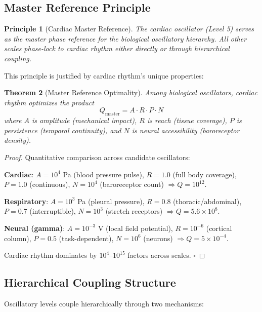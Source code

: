 \documentclass[12pt]{article}
\newtheorem{theorem}{Theorem}[section]
\newtheorem{principle}[theorem]{Principle}
\theoremstyle{remark}
\begin{document}
\subsection{Master Reference Principle}

\begin{principle}[Cardiac Master Reference]
The cardiac oscillator (Level 5) serves as the master phase reference for the biological oscillatory hierarchy. All other scales phase-lock to cardiac rhythm either directly or through hierarchical coupling.
\end{principle}

This principle is justified by cardiac rhythm's unique properties:

\begin{theorem}[Master Reference Optimality]
Among biological oscillators, cardiac rhythm optimizes the product
\begin{equation}
Q_{\text{master}} = A \cdot R \cdot P \cdot N
\end{equation}
where $A$ is amplitude (mechanical impact), $R$ is reach (tissue coverage), $P$ is persistence (temporal continuity), and $N$ is neural accessibility (baroreceptor density).
\end{theorem}

\begin{proof}
Quantitative comparison across candidate oscillators:

\textbf{Cardiac}: $A = 10^4$ Pa (blood pressure pulse), $R = 1.0$ (full body coverage), $P = 1.0$ (continuous), $N = 10^4$ (baroreceptor count) $\Rightarrow Q = 10^{12}$.

\textbf{Respiratory}: $A = 10^3$ Pa (pleural pressure), $R = 0.8$ (thoracic/abdominal), $P = 0.7$ (interruptible), $N = 10^3$ (stretch receptors) $\Rightarrow Q = 5.6 \times 10^8$.

\textbf{Neural (gamma)}: $A = 10^{-3}$ V (local field potential), $R = 10^{-6}$ (cortical column), $P = 0.5$ (task-dependent), $N = 10^6$ (neurons) $\Rightarrow Q = 5 \times 10^{-4}$.

Cardiac rhythm dominates by $10^4$--$10^{15}$ factors across scales. $\square$
\end{proof}

\subsection{Hierarchical Coupling Structure}

Oscillatory levels couple hierarchically through two mechanisms:
\end{document}
